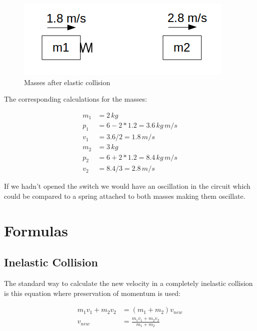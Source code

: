 \documentclass[]{../common/elementary-physics}
\begin{document}
\begin{figure}[ht] \centering
	\includegraphics[scale=.5]{mms3} \caption{Masses after elastic collision}
\end{figure}

The corresponding calculations for the masses:

\begin{subequations}
\begin{align}
m_1 &= 2 \, kg \\
p_1 &= 6 - 2*1.2 = 3.6 \, kg \, m/s \\
v_1 &= 3.6 / 2 = 1.8 \, m/s \\
m_2 &= 3 \, kg \\
p_2 &= 6 + 2*1.2 = 8.4 \, kg \, m/s \\
v_2 &= 8.4 / 3 = 2.8 \, m/s 
\end{align}
\end{subequations}

If we hadn't opened the switch we would have an oscillation in the circuit which could be compared to a spring attached to both masses making them oscillate.

\section{Formulas}

\subsection{Inelastic Collision}

The standard way to calculate the new velocity in a completely inelastic collision is this equation where preservation of momentum is used:

\begin{subequations}
\begin{align}
m_1 v_1 + m_2 v_2 &= (m_1 + m_2)v_{new} \\
v_{new} &= \frac{m_1 v_1 + m_2 v_2}{m_1 + m_2}
\end{align}
\end{subequations}
\end{document}
